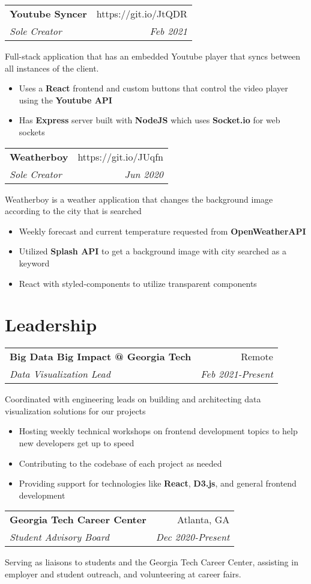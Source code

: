 \documentclass[letterpaper,8pt]{article}
\makeatletter
\newcommand{\resumeSubheading}[4]{
  \vspace{0.25em}
  \begin{tabular*}{1\textwidth}[t]{l@{\extracolsep{\fill}}r}
    \textbf{#1} & #2 \\
    \textit{#3} & \textit{#4} \\
  \end{tabular*}\vspace{-5pt}
}
\makeatother
\begin{document}
\resumeSubheading{Youtube Syncer}{https://git.io/JtQDR}{Sole Creator}{Feb 2021}

Full-stack application that has an embedded Youtube player that syncs between all instances of the client.

\begin{itemize}[label=\raisebox{0.25ex}{\tiny$\bullet$}]
    \item Uses a \textbf{React} frontend and custom buttons that control the video player using the \textbf{Youtube API}
    \item Has \textbf{Express} server built with \textbf{NodeJS} which uses \textbf{Socket.io} for web sockets
\end{itemize}
\vspace{3pt}

\resumeSubheading{Weatherboy}{https://git.io/JUqfn}{Sole Creator}{Jun 2020}

Weatherboy is a weather application that changes the background image according to the city that is searched

\begin{itemize}[label=\raisebox{0.25ex}{\tiny$\bullet$}]
  \item Weekly forecast and current temperature requested from \textbf{OpenWeatherAPI}
  \item Utilized \textbf{Splash API} to get a background image with city searched as a keyword
  \item React with styled-components to utilize transparent components
\end{itemize}
\vspace{3pt}

\section{Leadership}
\resumeSubheading{Big Data Big Impact @ Georgia Tech}{Remote}{Data Visualization Lead}{Feb 2021-Present}

Coordinated with engineering leads on building and architecting data visualization solutions for our projects

\begin{itemize}[label=\raisebox{0.25ex}{\tiny$\bullet$}]
    \item Hosting weekly technical workshops on frontend development topics to help new developers get up to speed
    \item Contributing to the codebase of each project as needed
    \item Providing support for technologies like \textbf{React}, \textbf{D3.js}, and general frontend development
\end{itemize}
\vspace{3pt}


\resumeSubheading{Georgia Tech Career Center}{Atlanta, GA}{Student Advisory Board}{Dec 2020-Present}

Serving as liaisons to students and the Georgia Tech Career Center, assisting in employer and student outreach, and volunteering at career fairs.
\end{document}
